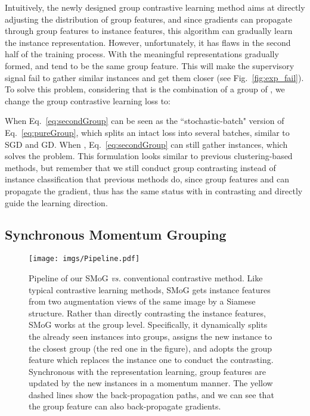 \documentclass[runningheads]{style/llncs}
\begin{document}
Intuitively, the newly designed group contrastive learning method aims at directly adjusting the distribution of group features, and since gradients can propagate through group features to instance features, this algorithm can gradually learn the instance representation. However, unfortunately, it has flaws in the second half of the training process. With the meaningful representations gradually formed,  and  tend to be the same group feature. This will make the supervisory signal fail to gather similar instances and get them closer (see Fig.~\ref{fig:exp_fail}). To solve this problem, considering that  is the combination of a group of , we change the group contrastive learning loss to:

When  Eq.~\ref{eq:secondGroup} can be seen as the ``stochastic-batch" version of Eq.~\ref{eq:pureGroup}, which splits an intact loss into several batches, similar to SGD and GD. When , Eq.~\ref{eq:secondGroup} can still gather instances, which solves the problem. This formulation looks similar to previous clustering-based methods, but remember that we still conduct group contrasting instead of instance classification that previous methods do, since group features  and  can propagate the gradient, thus has the same status with  in contrasting and directly guide the learning direction.
 

\subsection{Synchronous Momentum Grouping}

\begin{figure}[t]
	\begin{center}
		\texttt{[image: imgs/Pipeline.pdf]}
	\end{center}
	\caption{Pipeline of our SMoG \textit{vs.} conventional contrastive method. Like typical contrastive learning methods, SMoG gets instance features from two augmentation views of the same image by a Siamese structure. Rather than directly contrasting the instance features, SMoG works at the group level. Specifically, it dynamically splits the already seen instances into groups, assigns the new instance to the closest group (the red one in the figure), and adopts the group feature which replaces the instance one to conduct the contrasting. Synchronous with the representation learning, group features are updated by the new instances in a momentum manner. The yellow dashed lines show the back-propagation paths, and we can see that the group feature can also back-propagate gradients.} 
	\label{fig:pipeline}
\end{figure}
\end{document}
